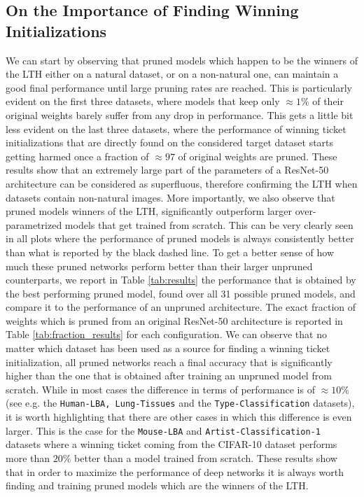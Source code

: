 \subsection{On the Importance of Finding Winning Initializations}
We can start by observing that pruned models which happen to be the winners of the LTH either on a natural dataset, or on a non-natural one, can maintain a good final performance until large pruning rates are reached. This is particularly evident on the first three datasets, where models that keep only $\approx 1\%$ of their original weights barely suffer from any drop in performance. This gets a little bit less evident on the last three datasets, where the performance of winning ticket initializations that are directly found on the considered target dataset starts getting harmed once a fraction of $\approx 97$ of original weights are pruned. These results show that an extremely large part of the parameters of a ResNet-50 architecture can be considered as superfluous, therefore confirming the LTH when datasets contain non-natural images. More importantly, we also observe that pruned models winners of the LTH, significantly outperform larger over-parametrized models that get trained from scratch. This can be very clearly seen in all plots where the performance of pruned models is always consistently better than what is reported by the black dashed line. To get a better sense of how much these pruned networks perform better than their larger unpruned counterparts, we report in Table \ref{tab:results} the performance that is obtained by the best performing pruned model, found over all 31 possible pruned models, and compare it to the performance of an unpruned architecture. The exact fraction of weights which is pruned from an original ResNet-50 architecture is reported in Table \ref{tab:fraction_results} for each configuration. We can observe that no matter which dataset has been used as a source for finding a winning ticket initialization, all pruned networks reach a final accuracy that is significantly higher than the one that is obtained after training an unpruned model from scratch. While in most cases the difference in terms of performance is of $\approx 10\%$ (see e.g. the \texttt{Human-LBA, Lung-Tissues} and the \texttt{Type-Classification} datasets), it is worth highlighting that there are other cases in which this difference is even larger. This is the case for the \texttt{Mouse-LBA} and \texttt{Artist-Classification-1} datasets where a winning ticket coming from the CIFAR-10 dataset performs more than $20\%$ better than a model trained from scratch. These results show that in order to maximize the performance of deep networks it is always worth finding and training pruned models which are the winners of the LTH.

